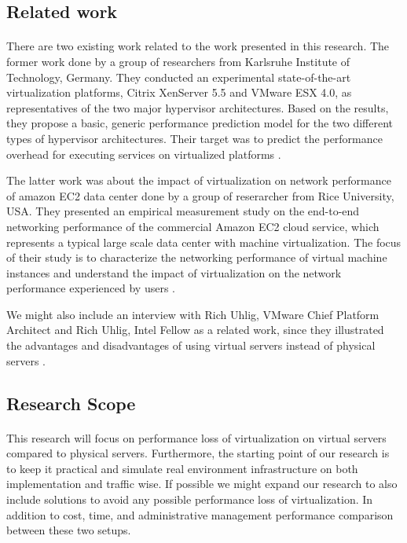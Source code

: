 \subsection{Related work}
\paragraph{}
There are two existing work related to the work presented in this research. The former work done by a group of researchers from Karlsruhe Institute of Technology, Germany. They conducted an experimental  state-of-the-art virtualization platforms, Citrix XenServer 5.5 and VMware ESX 4.0, as representatives of the two major hypervisor architectures. Based on the results, they propose a basic, generic performance prediction model for the two different types of hypervisor architectures. Their target was to predict the performance overhead for executing services on virtualized platforms \cite{rw1}. 
\par\indent
The latter work was about the impact of virtualization on network performance of amazon EC2 data center done by a group of reserarcher from Rice University, USA. They presented an empirical measurement study on the end-to-end networking performance of the commercial Amazon EC2 cloud service, which represents a typical large scale data center with machine virtualization. The focus of their study is to characterize the networking performance of virtual machine instances and understand the impact of virtualization on the network performance experienced by users \cite{rw2}.
\par\indent
We might also include an interview with Rich Uhlig, VMware Chief Platform Architect and Rich Uhlig, Intel Fellow as a related work, since they illustrated the advantages and disadvantages of using virtual servers instead of physical servers \cite{rw3}.


\subsection{Research Scope}
\paragraph{}
This research will focus on performance loss of virtualization on virtual servers compared to physical servers. Furthermore, the starting point of our research is to keep it practical and simulate real environment infrastructure on both implementation and traffic wise. If possible we might expand our research to also include solutions to avoid any possible performance loss of virtualization. In addition to cost, time, and administrative management performance comparison between these two setups.   


